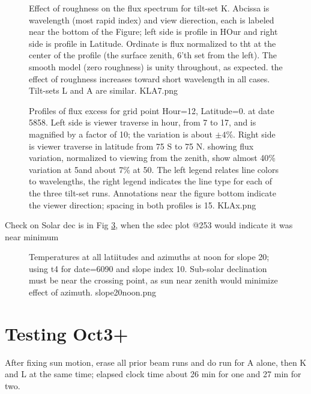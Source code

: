 \documentclass{article}
\begin{document}
\begin{figure}[!ht] 
\caption[Effect of roughness]{Effect of roughness on the flux spectrum for
  tilt-set K. Abcissa is wavelength (most rapid index) and view dierection, each
  is labeled near the bottom of the Figure; left side is profile in HOur and
  right side is profile in Latitude. Ordinate is flux normalized to tht at the
  center of the profile (the surface zenith, 6'th set from the left). The smooth
  model (zero roughness) is unity throughout, as expected. the effect of
  roughness increases toward short wavelength in all cases. Tilt-sets L and A
  are similar.
\label{KLA7} KLA7.png  }
\end{figure} 

\begin{figure}[!ht] 
\caption[Flux profiles]{Profiles of flux excess for grid point Hour=12,
  Latitude=0. at date 5858. Left side is viewer traverse in hour, from 7 to 17,
  and is magnified by a factor of 10; the variation is about $\pm 4$\%.  Right
  side is viewer traverse in latitude from 75 S to 75 N. showing flux variation,
  normalized to viewing from the zenith, show almost 40\% variation at 5\um and
  about 7\% at 50\um. The left legend relates line colors to wavelengths, the
  right legend indicates the line type for each of the three tilt-set
  runs. Annotations near the figure bottom indicate the viewer direction;
  spacing in both profiles is 15\qd.
\label{KLAx}  KLAx.png  }
\end{figure} 

Check on Solar dec is in Fig \ref{slope20noon}, when the sdec plot @253 would indicate it was near minimum

\begin{figure}[!ht] 
\caption[slope20noon]{Temperatures at all latiitudes and azimuths at noon for
  slope 20\qd; using t4 for date=6090 and slope index 10. Sub-solar declination
  must be near the crossing point, as sun near zenith would minimize effect of
  azimuth.
\label{slope20noon}  slope20noon.png  }
\end{figure} 
 \section{Testing Oct3+}
After fixing sun motion, erase all prior beam runs and do run for A alone, then
K and L at the same time; elapsed clock time about 26 min for one and 27 min for
two.
\end{document}
